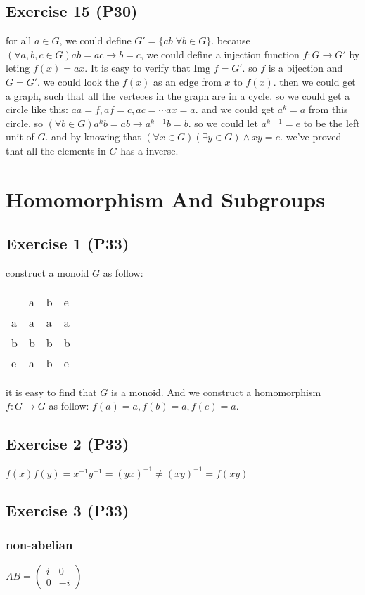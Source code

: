 \documentclass[11pt]{article}
\begin{document}
\subsection{Exercise 15 (P30)}
\label{sec:org47714cb}
for all \(a\in G\), we could define \(G' = \{ab| \forall b\in G\}\).
because \((\forall a, b, c \in G) ab = ac \to b = c\), we could define a injection function
\(f: G\to G'\) by leting \(f(x) = ax\). It is easy to verify that \(\mbox{Img } f = G'\).
so \(f\) is a bijection and \(G = G'\).
we could look the \(f(x)\) as an edge from \(x\) to \(f(x)\). then we could get
a graph, such that all the verteces in the graph are in a cycle.
so we could get a circle like this: \(aa = f, af = c, ac = \cdots ax = a\).
and we could get \(a^k = a\) from this circle. so \((\forall b\in G) a^kb = ab \to a^{k-1}b = b\).
so we could let \(a^{k-1} = e\) to be the left unit of \(G\).
and by knowing that \((\forall x\in G)(\exists y\in G)\land xy = e\).
we've proved that all the elements in \(G\) has a inverse.
\section{Homomorphism And Subgroups}
\label{sec:orgee29e08}
\subsection{Exercise 1 (P33)}
\label{sec:orgca0baab}
construct a monoid \(G\) as follow:
\begin{center}
\begin{tabular}{llll}
 & a & b & e\\
a & a & a & a\\
b & b & b & b\\
e & a & b & e\\
\end{tabular}
\end{center}
it is easy to find that \(G\) is a monoid.
And we construct a homomorphism \(f: G\to G\) as follow:
\(f(a) = a, f(b) = a, f(e) = a\).
\subsection{Exercise 2 (P33)}
\label{sec:org9825f9f}
\(f(x)f(y) = x^{-1}y^{-1} = (yx)^{-1} \not= (xy)^{-1} = f(xy)\)
\subsection{Exercise 3 (P33)}
\label{sec:org98b28d0}
\subsubsection{non-abelian}
\label{sec:org7409d46}
\(AB = \left(\begin{array}{cc} i & 0 \\ 0 & -i \end{array}\right)\)
\end{document}
